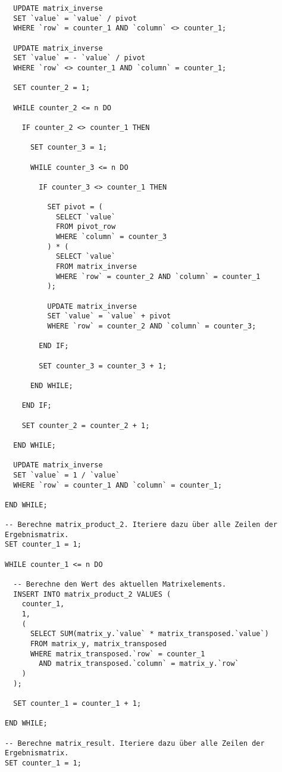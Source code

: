 \begin{verbatim}
  UPDATE matrix_inverse
  SET `value` = `value` / pivot
  WHERE `row` = counter_1 AND `column` <> counter_1;

  UPDATE matrix_inverse
  SET `value` = - `value` / pivot
  WHERE `row` <> counter_1 AND `column` = counter_1;

  SET counter_2 = 1;

  WHILE counter_2 <= n DO

    IF counter_2 <> counter_1 THEN

      SET counter_3 = 1;

      WHILE counter_3 <= n DO

        IF counter_3 <> counter_1 THEN

          SET pivot = (
            SELECT `value`
            FROM pivot_row
            WHERE `column` = counter_3
          ) * (
            SELECT `value`
            FROM matrix_inverse
            WHERE `row` = counter_2 AND `column` = counter_1
          );

          UPDATE matrix_inverse
          SET `value` = `value` + pivot
          WHERE `row` = counter_2 AND `column` = counter_3;

        END IF;

        SET counter_3 = counter_3 + 1;

      END WHILE;

    END IF;

    SET counter_2 = counter_2 + 1;

  END WHILE;

  UPDATE matrix_inverse
  SET `value` = 1 / `value`
  WHERE `row` = counter_1 AND `column` = counter_1;

END WHILE;

-- Berechne matrix_product_2. Iteriere dazu über alle Zeilen der Ergebnismatrix.
SET counter_1 = 1;

WHILE counter_1 <= n DO

  -- Berechne den Wert des aktuellen Matrixelements.
  INSERT INTO matrix_product_2 VALUES (
    counter_1,
    1,
    (
      SELECT SUM(matrix_y.`value` * matrix_transposed.`value`)
      FROM matrix_y, matrix_transposed
      WHERE matrix_transposed.`row` = counter_1
        AND matrix_transposed.`column` = matrix_y.`row`
    )
  );

  SET counter_1 = counter_1 + 1;

END WHILE;

-- Berechne matrix_result. Iteriere dazu über alle Zeilen der Ergebnismatrix.
SET counter_1 = 1;


\end{verbatim}
